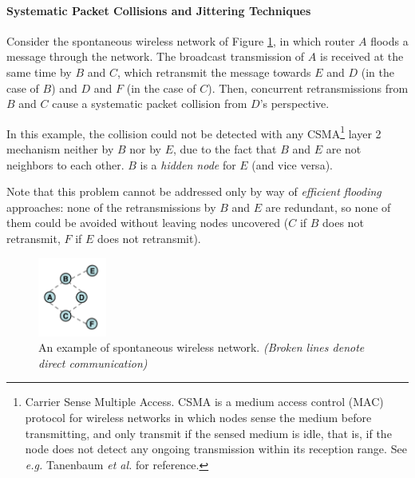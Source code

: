

\paragraph{Systematic Packet Collisions and Jittering Techniques}

Consider the spontaneous wireless network of Figure \ref{f:syspcol}, in which router $A$ floods a message through the network. The broadcast transmission of $A$ is received at the same time by $B$ and $C$, which retransmit the message towards $E$ and $D$ (in the case of $B$) and $D$ and $F$ (in the case of $C$). Then, concurrent retransmissions from $B$ and $C$ cause a systematic packet collision from $D$'s perspective.

\begin{remark}
In this example, the collision could not be detected with any CSMA\footnote{Carrier Sense Multiple Access. CSMA is a medium access control (MAC) protocol for wireless networks in which nodes sense the medium before transmitting, and only transmit if the sensed medium is idle, that is, if the node does not detect any ongoing transmission within its reception range. See {\em e.g.} Tanenbaum {\em et al.} \cite{tanenbaum} for reference.} layer 2 mechanism neither by $B$ nor by $E$, due to the fact that $B$ and $E$ are not neighbors to each other. $B$ is a {\em hidden node} for $E$ (and vice versa).
\end{remark}

\begin{remark}
Note that this problem cannot be addressed only by way of {\em efficient flooding} approaches: none of the retransmissions by $B$ and $E$ are redundant, so none of them could be avoided without leaving nodes uncovered ($C$ if $B$ does not retransmit, $F$ if $E$ does not retransmit). 
\end{remark}

\begin{figure}
\centering
\includegraphics[width=0.2\textwidth]{Figures/abcdef-crop.pdf}
\caption{An example of spontaneous wireless network. {\em (Broken lines denote direct communication)}}
\label{f:syspcol}
\end{figure}

